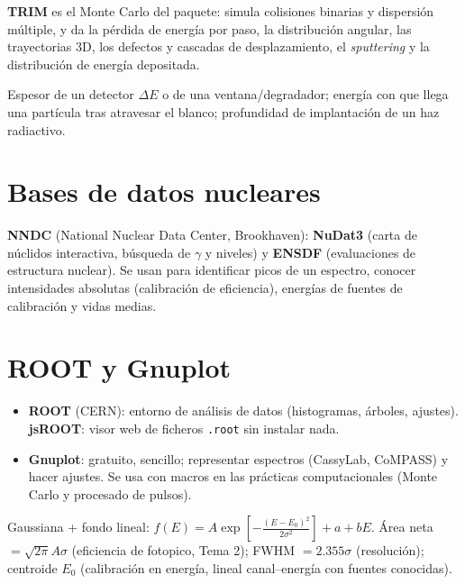 \textbf{TRIM} es el Monte Carlo del paquete: simula colisiones binarias y dispersión múltiple, y da la pérdida de energía por paso, la distribución angular,
las trayectorias 3D, los defectos y cascadas de desplazamiento, el \emph{sputtering} y la distribución de energía depositada.

\begin{ejemplo}
Espesor de un detector $\Delta E$ o de una ventana/degradador; energía con que llega una partícula tras atravesar el blanco; profundidad de implantación de un haz radiactivo.
\end{ejemplo}

\section{Bases de datos nucleares}
\textbf{NNDC} (National Nuclear Data Center, Brookhaven): \textbf{NuDat3} (carta de núclidos interactiva, búsqueda de $\gamma$ y niveles) y \textbf{ENSDF}
(evaluaciones de estructura nuclear). Se usan para identificar picos de un espectro, conocer intensidades absolutas (calibración de eficiencia),
energías de fuentes de calibración y vidas medias.

\section{ROOT y Gnuplot}
\begin{itemize}
\item \textbf{ROOT} (CERN): entorno de análisis de datos (histogramas, árboles, ajustes). \textbf{jsROOT}: visor web de ficheros \texttt{.root} sin instalar nada.
\item \textbf{Gnuplot}: gratuito, sencillo; representar espectros (CassyLab, CoMPASS) y hacer ajustes. Se usa con macros en las prácticas computacionales
(Monte Carlo y procesado de pulsos).
\end{itemize}

\begin{dato}
Gaussiana + fondo lineal:
$f(E)=A\exp\!\left[-\frac{(E-E_0)^2}{2\sigma^2}\right]+a+bE$.
Área neta $=\sqrt{2\pi}A\sigma$ (eficiencia de fotopico, Tema 2); FWHM $=2.355\sigma$ (resolución); centroide $E_0$ (calibración en energía, lineal canal--energía con fuentes conocidas).
\end{dato}
